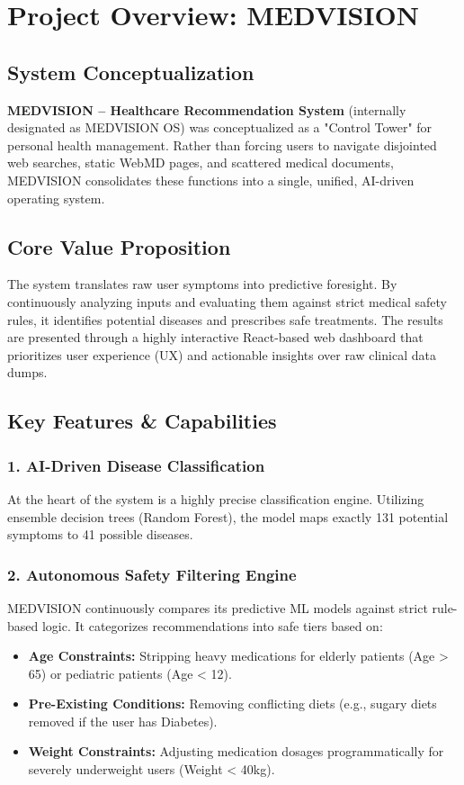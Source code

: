 \documentclass[12pt,a4paper]{report}
\begin{document}
\chapter{Project Overview: MEDVISION}

\section{System Conceptualization}
\textbf{MEDVISION – Healthcare Recommendation System} (internally designated as MEDVISION OS) was conceptualized as a "Control Tower" for personal health management. Rather than forcing users to navigate disjointed web searches, static WebMD pages, and scattered medical documents, MEDVISION consolidates these functions into a single, unified, AI-driven operating system.

\section{Core Value Proposition}
The system translates raw user symptoms into predictive foresight. By continuously analyzing inputs and evaluating them against strict medical safety rules, it identifies potential diseases and prescribes safe treatments. The results are presented through a highly interactive React-based web dashboard that prioritizes user experience (UX) and actionable insights over raw clinical data dumps.

\section{Key Features \& Capabilities}

\subsection{1. AI-Driven Disease Classification}
At the heart of the system is a highly precise classification engine. Utilizing ensemble decision trees (Random Forest), the model maps exactly 131 potential symptoms to 41 possible diseases. 

\subsection{2. Autonomous Safety Filtering Engine}
MEDVISION continuously compares its predictive ML models against strict rule-based logic. It categorizes recommendations into safe tiers based on:
\begin{itemize}
    \item \textbf{Age Constraints:} Stripping heavy medications for elderly patients (Age > 65) or pediatric patients (Age < 12).
    \item \textbf{Pre-Existing Conditions:} Removing conflicting diets (e.g., sugary diets removed if the user has Diabetes).
    \item \textbf{Weight Constraints:} Adjusting medication dosages programmatically for severely underweight users (Weight < 40kg).
\end{itemize}
\end{document}
